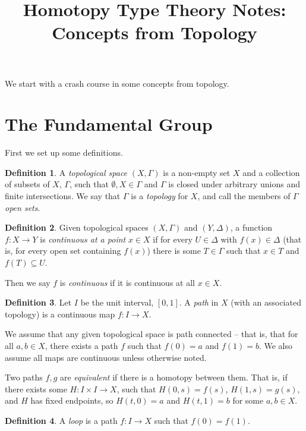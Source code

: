 \documentclass[a4paper,12pt]{article}
\title{Homotopy Type Theory Notes: Concepts from Topology}
\author{}
\newcommand{\sub}{\subseteq}
\theoremstyle{definition}
\newtheorem*{defn}{Definition}
\begin{document}
\maketitle

We start with a crash course in some concepts from topology.

\section{The Fundamental Group}

First we set up some definitions.

\begin{defn}
A \emph{topological space} $(X, \Gamma)$ is a non-empty set $X$ and a collection of subsets of $X$, $\Gamma$, such that $\emptyset, X\in \Gamma$ and $\Gamma$ is closed under arbitrary unions and finite intersections.
We say that $\Gamma$ is a \emph{topology} for $X$, and call the members of $\Gamma$ \emph{open sets}.
\end{defn}

\begin{defn}
Given topological spaces $(X, \Gamma)$ and $(Y, \Delta)$, a function $f: X\to Y$ is \emph{continuous at a point} $x\in X$ if for every $U\in\Delta$ with $f(x)\in \Delta$ (that is, for every open set containing $f(x)$) there is some $T\in \Gamma$ such that $x\in T$ and $f(T)\sub U$.

Then we say $f$ is \emph{continuous} if it is continuous at all $x\in X$.
\end{defn}

\begin{defn}
Let $I$ be the unit interval, $[0, 1]$.
A \emph{path} in $X$ (with an associated topology) is a continuous map $f: I\to X$.
\end{defn}

We assume that any given topological space is path connected -- that is, that for all $a, b\in X$, there exists a path $f$ such that $f(0) = a$ and $f(1) = b$.
We also assume all maps are continuous unless otherwise noted.

Two paths $f, g$ are \emph{equivalent} if there is a homotopy between them.
That is, if there exists some $H: I\times I\to X$, such that $H(0, s) = f(s)$, $H(1, s) = g(s)$, and $H$ has fixed endpoints, so $H(t, 0) = a$ and $H(t, 1) = b$ for some $a, b\in X$.

\begin{defn}
A \emph{loop} is a path $f: I\to X$ such that $f(0) = f(1)$.
\end{defn}
\end{document}
